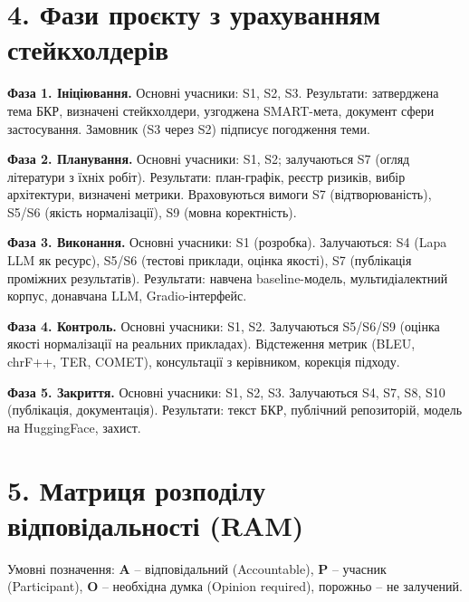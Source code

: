 \documentclass[14pt]{extarticle}
\begin{document}
\section*{4. Фази проєкту з урахуванням стейкхолдерів}

\textbf{Фаза 1. Ініціювання.} Основні учасники: S1, S2, S3. Результати: затверджена тема БКР, визначені стейкхолдери, узгоджена SMART-мета, документ сфери застосування. Замовник (S3 через S2) підписує погодження теми.

\textbf{Фаза 2. Планування.} Основні учасники: S1, S2; залучаються S7 (огляд літератури з їхніх робіт). Результати: план-графік, реєстр ризиків, вибір архітектури, визначені метрики. Враховуються вимоги S7 (відтворюваність), S5/S6 (якість нормалізації), S9 (мовна коректність).

\textbf{Фаза 3. Виконання.} Основні учасники: S1 (розробка). Залучаються: S4 (Lapa LLM як ресурс), S5/S6 (тестові приклади, оцінка якості), S7 (публікація проміжних результатів). Результати: навчена baseline-модель, мультидіалектний корпус, донавчана LLM, Gradio-інтерфейс.

\textbf{Фаза 4. Контроль.} Основні учасники: S1, S2. Залучаються S5/S6/S9 (оцінка якості нормалізації на реальних прикладах). Відстеження метрик (BLEU, chrF++, TER, COMET), консультації з керівником, корекція підходу.

\textbf{Фаза 5. Закриття.} Основні учасники: S1, S2, S3. Залучаються S4, S7, S8, S10 (публікація, документація). Результати: текст БКР, публічний репозиторій, модель на HuggingFace, захист.

\section*{5. Матриця розподілу відповідальності (RAM)}

Умовні позначення: \textbf{A} -- відповідальний (Accountable), \textbf{P} -- учасник (Participant), \textbf{O} -- необхідна думка (Opinion required), порожньо -- не залучений.
\end{document}
